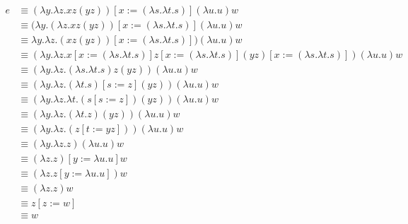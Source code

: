 \documentclass{article}
\begin{document}
\begin{enumerate}
{            \begin{align*}
                e &\equiv (\lambda y. \lambda z.xz(yz))[x:=(\lambda s. \lambda t.s)]
                (\lambda u. u) w \\
                &\equiv (\lambda y. (\lambda z.xz(yz))[x:=(\lambda s. \lambda t.s)]
                (\lambda u. u) w \\
                &\equiv \lambda y. \lambda z.(xz(yz))[x:=(\lambda s. \lambda t.s)])
                (\lambda u. u) w \\
                &\equiv (\lambda y. \lambda z.
                x[x:=(\lambda s. \lambda t.s)]
                z[x:=(\lambda s. \lambda t.s)]
                (yz)[x:=(\lambda s. \lambda t.s)])
                (\lambda u. u) w \\
                &\equiv (\lambda y. \lambda z.
                (\lambda s. \lambda t.s)z(yz))
                (\lambda u. u) w \\
                &\equiv (\lambda y. \lambda z.
                (\lambda t.s)[s := z](yz))
                (\lambda u. u) w \\
                &\equiv (\lambda y. \lambda z.
                \lambda t.(s[s := z])(yz))
                (\lambda u. u) w \\
                &\equiv (\lambda y. \lambda z.
                (\lambda t.z)(yz))
                (\lambda u. u) w \\
                &\equiv (\lambda y. \lambda z.
                (z[t:=yz]))
                (\lambda u. u) w \\
                &\equiv (\lambda y. \lambda z.z)
                (\lambda u. u) w \\
                &\equiv (\lambda z.z) [y:=\lambda u. u] w \\
                &\equiv (\lambda z.z[y:=\lambda u. u]) w \\
                &\equiv (\lambda z.z) w \\
                &\equiv z [z:=w] \\
                &\equiv w \\
            \end{align*}
        }
    \end{enumerate}
\end{document}
